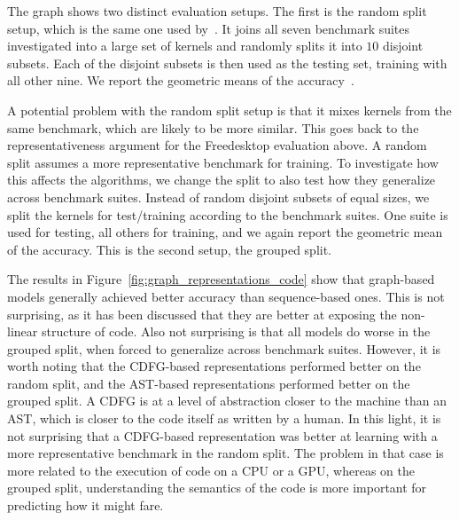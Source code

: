 The graph shows two distinct evaluation setups.
The first is the random split setup, which is the same one used by~\cite{cummins_pact17,inst2vec}.
It joins all seven benchmark suites investigated into a large set of kernels and randomly splits it into $10$ disjoint subsets.
Each of the disjoint subsets is then used as the testing set, training with all other nine.
We report the geometric means of the accuracy~\cite{fleming1986gmean}.

A potential problem with the random split setup is that it mixes kernels from the same benchmark, which are likely to be more similar. 
This goes back to the representativeness argument for the Freedesktop evaluation above.
A random split assumes a more representative benchmark for training.
To investigate how this affects the algorithms, we change the split to also test how they generalize across benchmark suites.
Instead of random disjoint subsets of equal sizes, we split the kernels for test/training according to the benchmark suites.
One suite is used for testing, all others for training, and we again report the geometric mean of the accuracy.
This is the second setup, the grouped split.

The results in Figure~\ref{fig:graph_representations_code} show that graph-based models generally achieved better accuracy than sequence-based ones.
This is not surprising, as it has been discussed that they are better at exposing the non-linear structure of code.
Also not surprising is that all models do worse in the grouped split, when forced to generalize across benchmark suites.
However, it is worth noting that the \ac{CDFG}-based representations performed better on the random split, and the \ac{AST}-based representations performed better on the grouped split.
A \ac{CDFG} is at a level of abstraction closer to the machine than an \ac{AST}, which is closer to the code itself as written by a human.
In this light, it is not surprising that a \ac{CDFG}-based representation was better at learning with a more representative benchmark in the random split.
The problem in that case is more related to the execution of code on a \ac{CPU} or a \ac{GPU}, whereas on the grouped split, understanding the semantics of the code is more important for predicting how it might fare.

